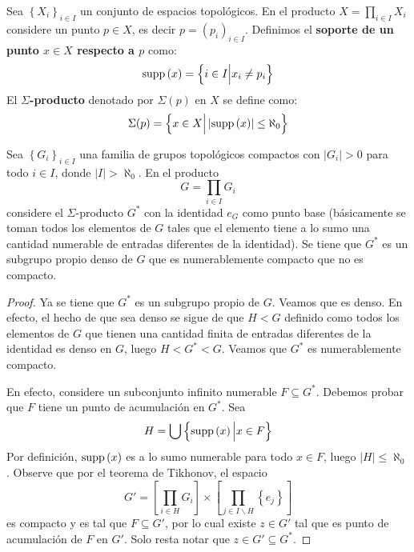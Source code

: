 \documentclass[12pt]{report}
\theoremstyle{largebreak}
\newcommand\abs[1]{\ensuremath{\left|#1\right|}}
\newcommand{\supp}[1]{\ensuremath{\textup{supp}\left(#1\right)}}
\begin{document}
    \begin{mydef}
        Sea $\left\{X_i\right\}_{ i\in I}$ un conjunto de espacios topológicos. En el producto $X=\prod_{ i\in I}X_i$ considere un punto $p\in X$, es decir $p=\left(p_i \right)_{ i\in I}$. Definimos el \textbf{soporte de un punto $x\in X$ respecto a $p$} como:
        \begin{equation*}
            \supp{x}=\left\{i\in I\Big|x_i\neq p_i \right\}
        \end{equation*}
        El \textbf{$\Sigma$-producto} denotado por $\Sigma(p)$ en $X$ se define como:
        \begin{equation*}
            \Sigma(p)=\left\{x\in X\Big|\abs{\supp{x}}\leq\aleph_0 \right\}
        \end{equation*}
    \end{mydef}

    \begin{exa}
        Sea $\left\{G_i \right\}_{ i\in I}$ una familia de grupos topológicos compactos con $\abs{G_i}>0$ para todo $i\in I$, donde $\abs{I}>\aleph_0$. En el producto
        \begin{equation*}
            G=\prod_{ i\in I}G_i
        \end{equation*}
        considere el $\Sigma$-producto $G^*$ con la identidad $e_G$ como punto base (básicamente se toman todos los elementos de $G$ tales que el elemento tiene a lo sumo una cantidad numerable de entradas diferentes de la identidad). Se tiene que $G^*$ es un subgrupo propio denso de $G$ que es numerablemente compacto que no es compacto.
    \end{exa}

    \begin{proof}
        Ya se tiene que $G^*$ es un subgrupo propio de $G$. Veamos que es denso. En efecto, el hecho de que sea denso se sigue de que $H<G$ definido como todos los elementos de $G$ que tienen una cantidad finita de entradas diferentes de la identidad es denso en $G$, luego $H<G^*<G$. Veamos que $G^*$ es numerablemente compacto.

        En efecto, considere un subconjunto infinito numerable $F\subseteq G^*$. Debemos probar que $F$ tiene un punto de acumulación en $G^*$. Sea
        \begin{equation*}
            H=\bigcup\left\{\supp{x}\Big|x\in F \right\}
        \end{equation*}
        Por definición, $\supp{x}$ es a lo sumo numerable para todo $x\in F$, luego $\abs{H}\leq\aleph_0$. Observe que por el teorema de Tikhonov, el espacio
        \begin{equation*}
            G'=\left[\prod_{i\in H}G_i\right]\times\left[\prod_{ j\in I\backslash H}\left\{e_j\right\} \right]
        \end{equation*}
        es compacto y es tal que $F\subseteq G'$, por lo cual existe $z\in G'$ tal que es punto de acumulación de $F$ en $G'$. Solo resta notar que $z\in G'\subseteq G^*$.
    \end{proof}
\end{document}
